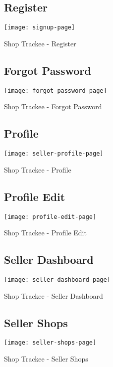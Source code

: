 \begin{figure}[h]
	\subsection{Register}
	\centering
	\texttt{[image: signup-page]}
	\caption{Shop Trackee - Register}
\end{figure}
\newpage

\begin{figure}[h]
	\subsection{Forgot Password}
	\centering
	\texttt{[image: forgot-password-page]}
	\caption{Shop Trackee - Forgot Password}
\end{figure}

\begin{figure}[h]
	\subsection{Profile}
	\centering
	\texttt{[image: seller-profile-page]}
	\caption{Shop Trackee - Profile}
\end{figure}
\newpage

\begin{figure}[h]
	\subsection{Profile Edit}
	\centering
	\texttt{[image: profile-edit-page]}
	\caption{Shop Trackee - Profile Edit}
\end{figure}


\begin{figure}[h]
	\subsection{Seller Dashboard}
	\centering
	\texttt{[image: seller-dashboard-page]}
	\caption{Shop Trackee - Seller Dashboard}
\end{figure}
\newpage

\begin{figure}[h]
	\subsection{Seller Shops}
	\centering
	\texttt{[image: seller-shops-page]}
	\caption{Shop Trackee - Seller Shops}
\end{figure}

